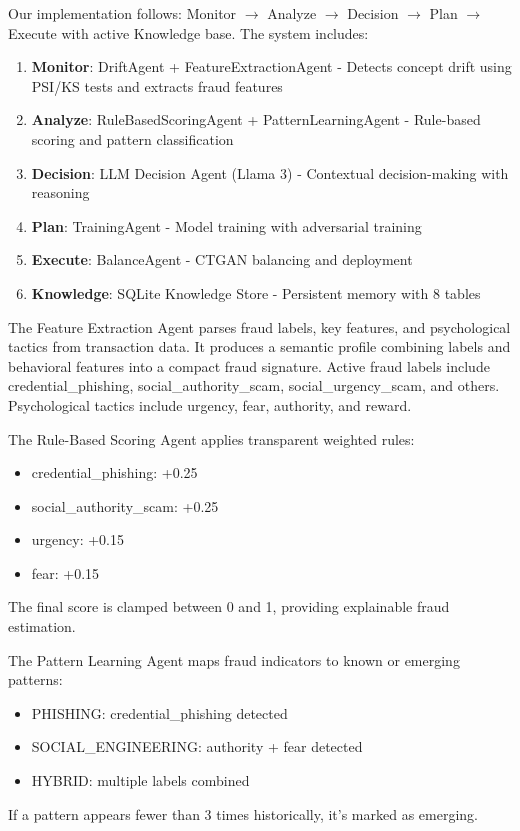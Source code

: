 Our implementation follows: Monitor $\rightarrow$ Analyze $\rightarrow$ Decision $\rightarrow$ Plan $\rightarrow$ Execute with active Knowledge base. The system includes:

\begin{enumerate}
  \item \textbf{Monitor}: DriftAgent + FeatureExtractionAgent - Detects concept drift using PSI/KS tests and extracts fraud features
  \item \textbf{Analyze}: RuleBasedScoringAgent + PatternLearningAgent - Rule-based scoring and pattern classification
  \item \textbf{Decision}: LLM Decision Agent (Llama 3) - Contextual decision-making with reasoning
  \item \textbf{Plan}: TrainingAgent - Model training with adversarial training
  \item \textbf{Execute}: BalanceAgent - CTGAN balancing and deployment
  \item \textbf{Knowledge}: SQLite Knowledge Store - Persistent memory with 8 tables
\end{enumerate}


The Feature Extraction Agent parses fraud labels, key features, and psychological tactics from transaction data. It produces a semantic profile combining labels and behavioral features into a compact fraud signature. Active fraud labels include credential\_phishing, social\_authority\_scam, social\_urgency\_scam, and others. Psychological tactics include urgency, fear, authority, and reward.


The Rule-Based Scoring Agent applies transparent weighted rules:
\begin{itemize}
  \item credential\_phishing: +0.25
  \item social\_authority\_scam: +0.25  
  \item urgency: +0.15
  \item fear: +0.15
\end{itemize}
The final score is clamped between 0 and 1, providing explainable fraud estimation.


The Pattern Learning Agent maps fraud indicators to known or emerging patterns:
\begin{itemize}
  \item PHISHING: credential\_phishing detected
  \item SOCIAL\_ENGINEERING: authority + fear detected
  \item HYBRID: multiple labels combined
\end{itemize}
If a pattern appears fewer than 3 times historically, it's marked as emerging.


